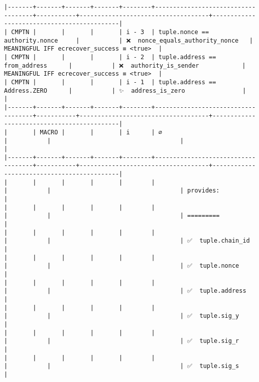 \documentclass[varwidth=\maxdimen,margin=0.5cm,multi={verbatim}]{standalone}
\begin{document}
\begin{verbatim}
|-------+-------+-------+-------+--------+------------------------------------+-----------+------------------------------------+--------------------------------------------|
| CMPTN |       |       |       | i - 3  | tuple.nonce == authority.nonce     |           | ❌  nonce_equals_authority_nonce   | MEANINGFUL IFF ecrecover_success ≡ <true>  |
| CMPTN |       |       |       | i - 2  | tuple.address == from_address      |           | ❌  authority_is_sender            | MEANINGFUL IFF ecrecover_success ≡ <true>  |
| CMPTN |       |       |       | i - 1  | tuple.address == Address.ZERO      |           | ✨  address_is_zero                |                                            |
|-------+-------+-------+-------+--------+------------------------------------+-----------+------------------------------------+--------------------------------------------|
|       | MACRO |       |       | i      | ∅                                  |           |                                    |                                            |
|-------+-------+-------+-------+--------+------------------------------------+-----------+------------------------------------+--------------------------------------------|
|       |       |       |       |        |                                    |           |                                    | provides:                                  |
|       |       |       |       |        |                                    |           |                                    | =========                                  |
|       |       |       |       |        |                                    |           |                                    | ✅  tuple.chain_id                         |
|       |       |       |       |        |                                    |           |                                    | ✅  tuple.nonce                            |
|       |       |       |       |        |                                    |           |                                    | ✅  tuple.address                          |
|       |       |       |       |        |                                    |           |                                    | ✅  tuple.sig_y                            |
|       |       |       |       |        |                                    |           |                                    | ✅  tuple.sig_r                            |
|       |       |       |       |        |                                    |           |                                    | ✅  tuple.sig_s                            |

\end{verbatim}
\end{document}
